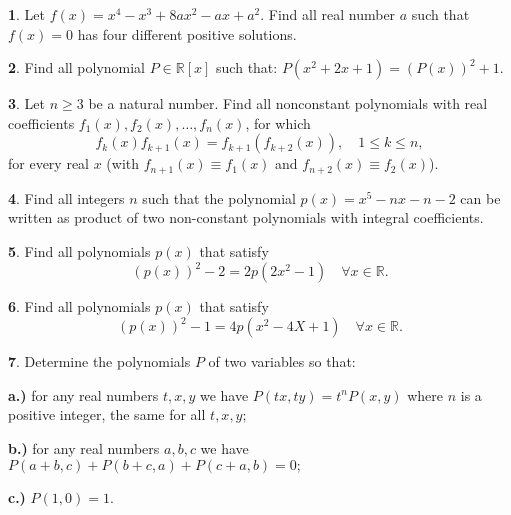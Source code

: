 \documentclass{article}
\theoremstyle{definition}
\newtheorem{p}{}
\begin{document}
\begin{p}
Let $ f(x)=x^4-x^3+8ax^2-ax+a^2$. Find all real number $ a$ such that $f(x)=0$ has four different positive solutions.
\end{p}




\begin{p}
Find all polynomial $ P\in \mathbb {R}[x]$ such that: $ P(x^2+2x+1)=(P(x))^2+1$.
\end{p}





\begin{p}
Let $ n\ge 3$ be a natural number. Find all nonconstant polynomials with real coefficients $ f_{1}\left(x\right),f_{2}\left(x\right),\ldots,f_{n}\left(x\right)$, for which
\[ f_{k}\left(x\right)f_{k+ 1}\left(x\right) = f_{k +1}\left(f_{k + 2}\left(x\right)\right), \quad  1\le k\le n,\]
for every real $ x$ (with $ f_{n +1}\left(x\right)\equiv f_{1}\left(x\right)$ and $ f_{n + 2}\left(x\right)\equiv f_{2}\left(x\right)$).
\end{p}





\begin{p}
Find all integers $n$ such that the polynomial $p(x)=x^5-nx-n-2$ can be written as product  of two non-constant polynomials with integral coefficients.
\end{p}




\begin{p}
Find all polynomials $p(x)$ that satisfy 
\[(p(x))^2-2=2p(2x^2-1) \quad \forall x \in \mathbb R.\]
\end{p}




\begin{p}
Find all polynomials $p(x)$ that satisfy
\[(p(x))^2-1=4p(x^2-4X+1) \quad \forall x \in \mathbb R.\]
\end{p}


\begin{p}
Determine the polynomials $P$ of two variables so that:

{\bf a.)} for any real numbers $t,x,y$ we have $P(tx,ty) = t^n P(x,y)$ where $n$ is a positive integer, the same for all $t,x,y;$

{\bf b.)} for any real numbers $a,b,c$ we have $P(a + b,c) + P(b + c,a) + P(c + a,b) = 0;$

{\bf c.)} $P(1,0) =1.$
\end{p}
\end{document}
